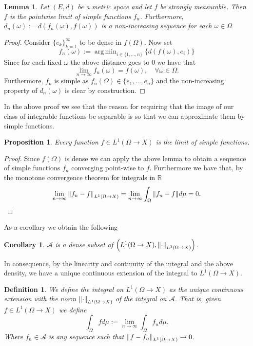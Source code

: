 \documentclass[12pt]{article}
\newtheorem{proposition}{Proposition}
\newtheorem{lemma}{Lemma}
\newtheorem{definition}{Definition}
\newtheorem{corollary}{Corollary}
\DeclareMathOperator*{\argmin}{arg\,min}
\begin{document}
\begin{lemma}
    Let $(E,d)$ be a metric space and let $f$ be strongly measurable. Then $f$ is the pointwise limit of simple functions $f_n$. Furthermore, \\$d_n(\omega):=d(f_n(\omega),f(\omega))$ is a non-increasing sequence for each $\omega\in\Omega$
\end{lemma}
\begin{proof}
    Consider $\{e_k\}_{k=1}^\infty$ to be dense in $f(\Omega)$. Now set
    \begin{equation*}
        f_n(\omega):= \argmin_{i\in\{1,...,n\}} \{d(f(\omega),e_i)\}
    \end{equation*}
    Since for each fixed $\omega$ the above distance goes to $0$ we have that
    \begin{equation*}
        \lim_{n\to\infty} f_n(\omega)=f(\omega),\quad \forall \omega\in\Omega.
    \end{equation*}
    Furthermore, $f_n$ is simple as $f_n(\Omega)\in \{e_1,...,e_n\}$ and the non-increasing property of $d_n(\omega)$ is clear by construction.
\end{proof}
In the above proof we see that the reason for requiring that the image of our class of integrable functions be separable is so that we can approximate them by simple functions.
\begin{proposition}
    Every function $f\in L^1(\Omega\to X)$ is the limit of simple functions.
\end{proposition}
\begin{proof}
    Since $f(\Omega)$ is dense we can apply the above lemma to obtain a sequence of simple functions $f_n$ converging point-wise to $f$. Furthermore we have that, by the monotone convergence theorem for integrals in $\mathbb{R}$
    \begin{equation*}
        \lim_{n\to\infty}\norm{f_n-f}_{L^1(\Omega\to X)}=\lim_{n\to\infty}\int_\Omega\norm{f_n-f}d\mu=0.
    \end{equation*}
\end{proof}
As a corollary we obtain the following
\begin{corollary}
    $\mathcal{A}$ is a dense subset of $\qty(L^1(\Omega\to X),\norm{\cdot}_{L^1(\Omega\to X)})$.
\end{corollary}
In consequence, by the linearity and continuity of the integral and the above density, we have a unique continuous extension of the integral to $L^1(\Omega\to X)$.
\begin{definition}
    We define the integral on $L^1(\Omega\to X)$ as the unique continuous extension with the norm $\norm{\cdot}_{L^1(\Omega\to X)}$ of the integral on $\mathcal{A}$. That is, given $f\in L^1(\Omega\to X)$ we define
    \begin{equation*}
        \int_\Omega f d\mu:=\lim_{n\to\infty} \int_\Omega f_n d\mu.
    \end{equation*}
    Where $f_n\in \mathcal{A}$ is any sequence such that $\norm{f-f_n}_{L^1(\Omega\to X)}\to 0$.
\end{definition}
\end{document}
